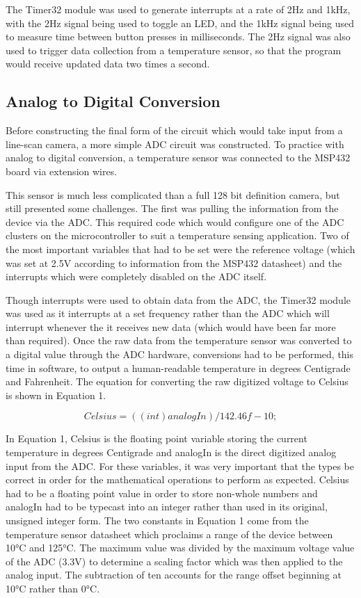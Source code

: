 \documentclass[conference]{IEEEtran}
\begin{document}
The Timer32 module was used to generate interrupts at a rate of 2Hz and
1kHz, with the 2Hz signal being used to toggle an LED, and the 1kHz signal
being used to measure time between button presses in milliseconds. The 2Hz
signal was also used to trigger data collection from a temperature sensor,
so that the program would receive updated data two times a second.


\subsection{Analog to Digital Conversion}
Before constructing the final form of the circuit which would take input from
a line-scan camera, a more simple ADC circuit was constructed. To practice
with analog to digital conversion, a temperature sensor was connected to the
MSP432 board via extension wires.

This sensor is much less complicated than a full 128 bit definition camera,
but still presented some challenges. The first was pulling the information
from the device via the ADC. This required code which would configure one of
the ADC clusters on the microcontroller to suit a temperature sensing
application. Two of the most important variables that had to be set were the
reference voltage (which was set at 2.5V according to information from the
MSP432 datasheet) and the interrupts which were completely disabled on the ADC
itself.

Though interrupts were used to obtain data from the ADC, the Timer32 module
was used as it interrupts at a set frequency rather than the ADC which will
interrupt whenever the it receives new data (which would have been far more
than required).
Once the raw data from the temperature sensor was converted to a digital value
through the ADC hardware, conversions had to be performed, this time in
software, to output a human-readable temperature in degrees Centigrade and
Fahrenheit. The equation for converting the raw digitized voltage to Celsius
is shown in Equation 1.

\begin{equation}
    Celsius = ((int) analogIn) / 142.46f - 10;
\end{equation}

In Equation 1, Celsius is the floating point variable storing the current
temperature in degrees Centigrade and analogIn is the direct digitized analog
input from the ADC. For these variables, it was very important that the types
be correct in order for the mathematical operations to perform as expected.
Celsius had to be a floating point value in order to store non-whole numbers
and analogIn had to be typecast into an integer rather than used in its
original, unsigned integer form. The two constants in Equation 1 come from the
temperature sensor datasheet which proclaims a range of the device between
10°C and 125°C. The maximum value was divided by the maximum voltage value of
the ADC (3.3V) to determine a scaling factor which was then applied to the
analog input. The subtraction of ten accounts for the range offset beginning
at 10°C rather than 0°C.
\end{document}
